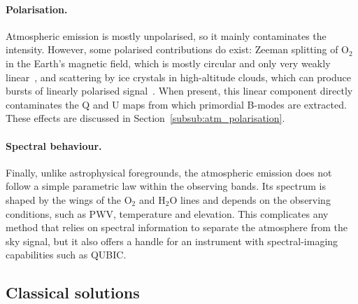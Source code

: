 \documentclass[a4paper,11pt]{article}
\begin{document}
\paragraph{Polarisation.} Atmospheric emission is mostly unpolarised, so it mainly contaminates the intensity. However, some polarised contributions do exist: Zeeman splitting of O$_2$ in the Earth's magnetic field, which is mostly circular and only very weakly linear~\cite{hanany2003,petroff2020}, and scattering by ice crystals in high-altitude clouds, which can produce bursts of linearly polarised signal~\cite{takakura2019,li2023}. When present, this linear component directly contaminates the Q and U maps from which primordial B-modes are extracted. These effects are discussed in Section~\ref{subsub:atm_polarisation}.

\paragraph{Spectral behaviour.} Finally, unlike astrophysical foregrounds, the atmospheric emission does not follow a simple parametric law within the observing bands. Its spectrum is shaped by the wings of the O$_2$ and H$_2$O lines and depends on the observing conditions, such as PWV, temperature and elevation. This complicates any method that relies on spectral information to separate the atmosphere from the sky signal, but it also offers a handle for an instrument with spectral-imaging capabilities such as QUBIC.

\subsection{Classical solutions}
\label{sec:classical_solutions}
\end{document}
